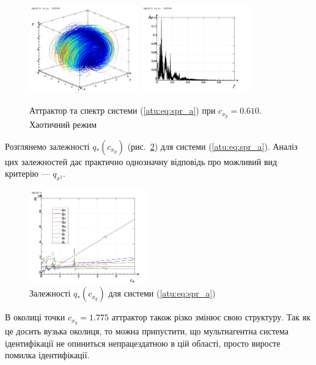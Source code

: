 \documentclass[a4paper,13pt]{atuaref}
\begin{document}
\begin{figure}[htb!]
\centerline{
  \includegraphics[width=0.42\textwidth]{p5/p/cha/spr_a/sprott_a-p_xyz_cx_y=0x610.png}
  \includegraphics[width=0.42\textwidth]{p5/p/cha/spr_a/sprott_a_f-p_f_cx_y=0x610.png}
}
\caption{Аттрактор та спектр системи (\ref{atu:eq:spr_a}) при $ c_{x_y} =0.610 $.
  Хаотичний режим
}
\label{atu:f:spr_a_p_0610}
\end{figure}

Розглянемо залежності $q_{*}(c_{x_y}) $ (рис.~\ref{atu:f:spr_a_q})
для системи (\ref{atu:eq:spr_a}). Аналіз цих залежностей дає практично
однозначну відповідь про можливий вид критерію --- $ q_{x^2} $.

\begin{figure}[htb!]
\centerline{
  \includegraphics[width=0.45\textwidth]{p5/p/cha/spr_a/sprott_a_q-p_c_x_y.png}
}
\caption{Залежності $q_{*}(c_{x_y})$ для системи (\ref{atu:eq:spr_a}) }
\label{atu:f:spr_a_q}
\end{figure}

В околиці точки $ c_ {x_y} = 1.775 $ аттрактор також різко змінює свою
структуру. Так як це досить вузька околиця, то можна припустити, що
мультиагентна система ідентифікації не опиниться непрацездатною в цій області,
просто виросте помилка ідентифікації.
\end{document}
